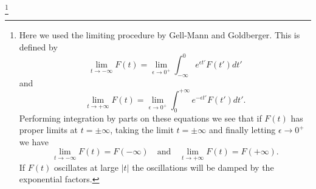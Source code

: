 \documentclass[11pt]{article}
\numberwithin{equation}{section}
\begin{document}
\footnote{
Here we used the limiting procedure by Gell-Mann and Goldberger. This is defined by
\begin{equation*}
\underset{t \rightarrow - \infty} \lim	F(t) = \underset{\epsilon \rightarrow 0^+}\lim \int^0_{-\infty} e^{\epsilon t'} F(t')dt'
\end{equation*}
and
\begin{equation*}
\underset{t \rightarrow + \infty} \lim	F(t) = \underset{\epsilon \rightarrow 0^+}\lim \int_0^{+\infty} e^{-\epsilon t'} F(t')dt'.
\end{equation*}
Performing integration by parts on these equations we see that if $F(t)$ has proper limits at $t = \pm \infty$, taking the limit $t = \pm \infty$ and finally letting $\epsilon \rightarrow 0^+$ we have
\begin{equation*}
	\underset{t \rightarrow - \infty} \lim	F(t) = F(-\infty) \quad \mbox{and} \quad \underset{t \rightarrow + \infty} \lim F(t) =	F(+\infty).
\end{equation*}
If $F(t)$ oscillates at large $|t|$ the oscillations will be damped by the exponential factors.
}
\end{document}
